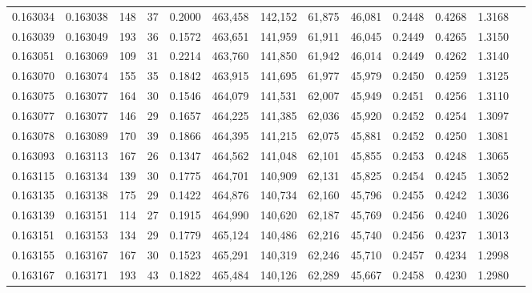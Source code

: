 \begin{tabular}{rrrrrrrrrrrrr}
0.163034 & 0.163038 &   148 &  37 &                                     0.2000 & 463,458 & 142,152 &  61,875 &  46,081 & 0.2448 & 0.4268 & 1.3168 \\
0.163039 & 0.163049 &   193 &  36 &                                     0.1572 & 463,651 & 141,959 &  61,911 &  46,045 & 0.2449 & 0.4265 & 1.3150 \\
0.163051 & 0.163069 &   109 &  31 &                                     0.2214 & 463,760 & 141,850 &  61,942 &  46,014 & 0.2449 & 0.4262 & 1.3140 \\
0.163070 & 0.163074 &   155 &  35 &                                     0.1842 & 463,915 & 141,695 &  61,977 &  45,979 & 0.2450 & 0.4259 & 1.3125 \\
0.163075 & 0.163077 &   164 &  30 &                                     0.1546 & 464,079 & 141,531 &  62,007 &  45,949 & 0.2451 & 0.4256 & 1.3110 \\
0.163077 & 0.163077 &   146 &  29 &                                     0.1657 & 464,225 & 141,385 &  62,036 &  45,920 & 0.2452 & 0.4254 & 1.3097 \\
0.163078 & 0.163089 &   170 &  39 &                                     0.1866 & 464,395 & 141,215 &  62,075 &  45,881 & 0.2452 & 0.4250 & 1.3081 \\
0.163093 & 0.163113 &   167 &  26 &                                     0.1347 & 464,562 & 141,048 &  62,101 &  45,855 & 0.2453 & 0.4248 & 1.3065 \\
0.163115 & 0.163134 &   139 &  30 &                                     0.1775 & 464,701 & 140,909 &  62,131 &  45,825 & 0.2454 & 0.4245 & 1.3052 \\
0.163135 & 0.163138 &   175 &  29 &                                     0.1422 & 464,876 & 140,734 &  62,160 &  45,796 & 0.2455 & 0.4242 & 1.3036 \\
0.163139 & 0.163151 &   114 &  27 &                                     0.1915 & 464,990 & 140,620 &  62,187 &  45,769 & 0.2456 & 0.4240 & 1.3026 \\
0.163151 & 0.163153 &   134 &  29 &                                     0.1779 & 465,124 & 140,486 &  62,216 &  45,740 & 0.2456 & 0.4237 & 1.3013 \\
0.163155 & 0.163167 &   167 &  30 &                                     0.1523 & 465,291 & 140,319 &  62,246 &  45,710 & 0.2457 & 0.4234 & 1.2998 \\
0.163167 & 0.163171 &   193 &  43 &                                     0.1822 & 465,484 & 140,126 &  62,289 &  45,667 & 0.2458 & 0.4230 & 1.2980 \\

\end{tabular}
